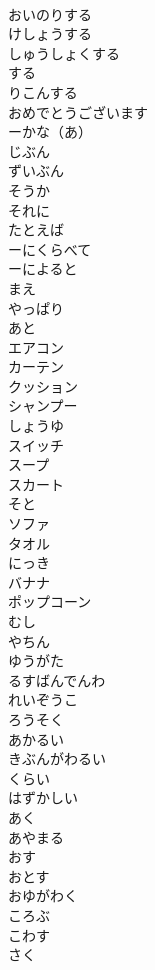 \documentclass[8pt]{extreport}
\begin{document}
\begin{CJK}{UTF8}{min}
\\	おいのりする	
\\	けしょうする	
\\	しゅうしょくする	
\\	する	
\\	りこんする	
\\	おめでとうございます	
\\	ーかな（あ）	
\\	じぶん	
\\	ずいぶん	
\\	そうか	
\\	それに	
\\	たとえば	
\\	ーにくらべて	
\\	ーによると	
\\	まえ	
\\	やっぱり	
\\	あと	
\\	エアコン	
\\	カーテン	
\\	クッション	
\\	シャンプー	
\\	しょうゆ	
\\	スイッチ	
\\	スープ	
\\	スカート	
\\	そと	
\\	ソファ	
\\	タオル	
\\	にっき	
\\	バナナ	
\\	ポップコーン	
\\	むし	
\\	やちん	
\\	ゆうがた	
\\	るすばんでんわ	
\\	れいぞうこ	
\\	ろうそく	
\\	あかるい	
\\	きぶんがわるい	
\\	くらい	
\\	はずかしい	
\\	あく	
\\	あやまる	
\\	おす	
\\	おとす	
\\	おゆがわく	
\\	ころぶ	
\\	こわす	
\\	さく	

\end{CJK}
\end{document}

